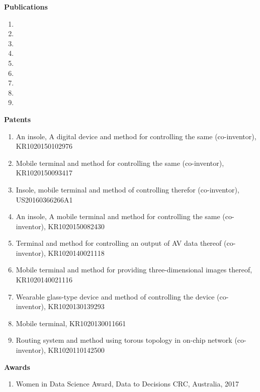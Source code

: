 \documentclass[letterpaper,11pt]{article}
\newcommand{\resheading}[1]{{\large \colorbox{mygrey}{\begin{minipage}{\textwidth}{\textbf{#1 \vphantom{p\^{E}}}}\end{minipage}}}}
\begin{document}
\pagebreak



\resheading{Publications}
    \begin{enumerate}
        \item {}
    	\item {}
        \item {}
        \item {}
        \item {}
        \item {}
        \item {}
        \item {}
        \item {}
    \end{enumerate}


\resheading{Patents}
    \begin{enumerate}
        \item An insole, A digital device and method for controlling the same (co-inventor), KR1020150102976
        \item Mobile terminal and method for controlling the same (co-inventor), KR1020150093417
        \item Insole, mobile terminal and method of controlling therefor (co-inventor), US20160366266A1
        \item An insole, A mobile terminal and method for controlling the same (co-inventor), KR1020150082430
        \item Terminal and method for controlling an output of AV data thereof (co-inventor), KR1020140021118
        \item Mobile terminal and method for providing three-dimensional images thereof, KR1020140021116
        \item Wearable glass-type device and method of controlling the device (co-inventor), KR1020130139293
        \item Mobile terminal, KR1020130011661
        \item Routing system and method using torous topology in on-chip network (co-inventor), KR1020110142500
    \end{enumerate}

\resheading{Awards}
    \begin{enumerate}
        \item Women in Data Science Award, Data to Decisions CRC, Australia, 2017
    \end{enumerate}
\end{document}
